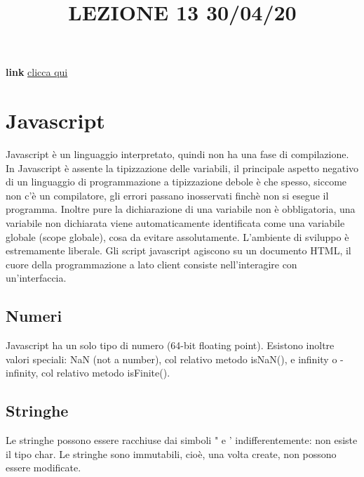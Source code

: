 \title{LEZIONE 13 30/04/20}
\textbf{link} \href{https://web.microsoftstream.com/video/9d3a5028-1a7e-471e-95cd-1bcf6ae58d8a?list=user&userId=cfe0965d-9a7c-40e2-be6e-f078296a1914}{clicca qui}
\section{Javascript}
Javascript è un linguaggio interpretato, quindi non ha una fase di compilazione.\newline
\newline
In Javascript è assente la tipizzazione delle variabili, il principale aspetto negativo di un linguaggio di programmazione a tipizzazione debole è che spesso, siccome non c'è un compilatore, gli errori passano inosservati finchè non si esegue il programma.\newline
Inoltre pure la dichiarazione di una variabile non è obbligatoria, una variabile non dichiarata viene automaticamente identificata come una variabile globale (scope globale), cosa da evitare assolutamente.\newline
L'ambiente di sviluppo è estremamente liberale.\newline
\newline
Gli script javascript agiscono su un documento HTML, il cuore della programmazione a lato client consiste nell'interagire con un'interfaccia.\newline
\newline
\subsection{Numeri}
Javascript ha un solo tipo di numero (64-bit floating point).\newline
\newline
Esistono inoltre valori speciali: NaN (not a number), col relativo metodo isNaN(), e infinity o -infinity, col relativo metodo isFinite().
\subsection{Stringhe}
Le stringhe possono essere racchiuse dai simboli " e ' indifferentemente: non esiste il tipo char.\newline
\newline
Le stringhe sono immutabili, cioè, una volta create, non possono essere modificate.
